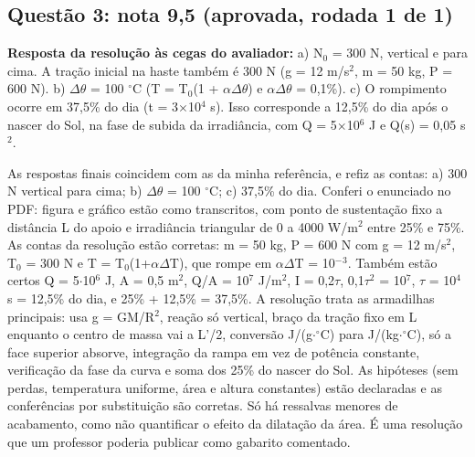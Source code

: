 \documentclass{article}%
\begin{document}
\subsection*{Questão 3: nota 9,5 (aprovada, rodada 1 de 1)}%
\textbf{Resposta da resolução às cegas do avaliador:} a) N$_{0}$ = 300 N, vertical e para cima. A tração inicial na haste também é 300 N (g = 12 m/s$^2$, m = 50 kg, P = 600 N).\newline%
b) $\Delta$$\theta$ = 100 $^\circ$C (T = T$_{0}$(1 + $\alpha$$\Delta$$\theta$) e $\alpha$$\Delta$$\theta$ = 0,1\%).\newline%
c) O rompimento ocorre em 37,5\% do dia (t = 3$\times$10$^{4}$ s). Isso corresponde a 12,5\% do dia após o nascer do Sol, na fase de subida da irradiância, com Q = 5$\times$10$^{6}$ J e Q(s) = 0,05 s$^2$.\par %
As respostas finais coincidem com as da minha referência, e refiz as contas: a) 300 N vertical para cima; b) $\Delta$$\theta$ = 100 $^\circ$C; c) 37,5\% do dia. Conferi o enunciado no PDF: figura e gráfico estão como transcritos, com ponto de sustentação fixo a distância L do apoio e irradiância triangular de 0 a 4000 W/m$^2$ entre 25\% e 75\%. As contas da resolução estão corretas: m = 50 kg, P = 600 N com g = 12 m/s$^2$, T$_{0}$ = 300 N e T = T$_{0}$(1+$\alpha$$\Delta$T), que rompe em $\alpha$$\Delta$T = 10$^{-}$$^3$. Também estão certos Q = 5$\cdot$10$^{6}$ J, A = 0,5 m$^2$, Q/A = 10$^{7}$ J/m$^2$, I = 0,2$\tau$, 0,1$\tau$$^2$ = 10$^{7}$, $\tau$ = 10$^{4}$ s = 12,5\% do dia, e 25\% + 12,5\% = 37,5\%. A resolução trata as armadilhas principais: usa g = GM/R$^2$, reação só vertical, braço da tração fixo em L enquanto o centro de massa vai a L'/2, conversão J/(g$\cdot$$^\circ$C) para J/(kg$\cdot$$^\circ$C), só a face superior absorve, integração da rampa em vez de potência constante, verificação da fase da curva e soma dos 25\% do nascer do Sol. As hipóteses (sem perdas, temperatura uniforme, área e altura constantes) estão declaradas e as conferências por substituição são corretas. Só há ressalvas menores de acabamento, como não quantificar o efeito da dilatação da área. É uma resolução que um professor poderia publicar como gabarito comentado.%
\end{document}
